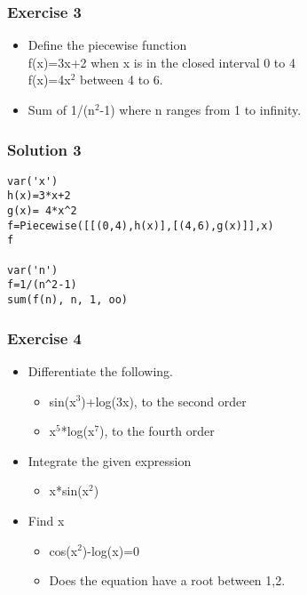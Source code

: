 \documentclass[17pt,compress]{beamer}
\begin{document}
\begin{frame}
\frametitle{Exercise 3}
\label{sec-8}


\begin{itemize}
\item Define the piecewise function\\ 
   f(x)=3x+2 
   when x is in the closed interval 0 to 4\\
   f(x)=4x$^2$
   between 4 to 6.\pause
\vspace{4pt}
\item Sum  of 1/(n$^2$-1) where n ranges from 1 to infinity.
\end{itemize}
\end{frame}
\begin{frame}[fragile]
\frametitle{Solution 3}
\label{sec-9}

\lstset{language=Python}
\begin{small}
\begin{lstlisting}
var('x') 
h(x)=3*x+2 
g(x)= 4*x^2
f=Piecewise([[(0,4),h(x)],[(4,6),g(x)]],x)
f

var('n')
f=1/(n^2-1) 
sum(f(n), n, 1, oo)
\end{lstlisting}
\end{small}
\end{frame}
\begin{frame}
\frametitle{Exercise 4}
\label{sec-10}

\begin{itemize}
\item Differentiate the following.
	\begin{itemize}
	\item sin(x$^3$)+log(3x), to the second order
	\item x$^5$*log(x$^7$), to the fourth order
	\end{itemize}
\vspace{4pt}
\item Integrate the given expression
	\begin{itemize}
	\item x*sin(x$^2$)
	\end{itemize}
\vspace{4pt}
\item Find x
	\begin{itemize}
	\item cos(x$^2$)-log(x)=0
	\item Does the equation have a root between 1,2.
	\end{itemize}
\end{itemize}
\end{frame}
\end{document}
